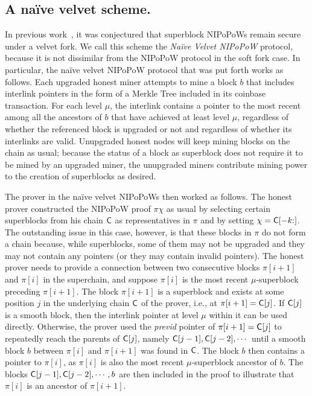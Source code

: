 \subsection{A na\"ive velvet scheme.}
In previous work~\cite{nipopows}, it was conjectured that superblock NIPoPoWs
remain secure under a velvet fork. We call this scheme the \emph{Na\"ive Velvet
NIPoPoW} protocol, because it is not dissimilar from the NIPoPoW protocol in the
soft fork case. In particular, the na\"ive velvet NIPoPoW protocol that was put
forth works as follows. Each upgraded honest miner attempts to mine a block $b$
that includes interlink pointers in the form of a Merkle Tree included in its
coinbase transaction. For each level $\mu$, the interlink contains a pointer to
the most recent among all the ancestors of $b$ that have achieved at least
level $\mu$, regardless of whether the referenced block is upgraded or not and
regardless of whether its interlinks are valid. Unupgraded honest nodes will
keep mining blocks on the chain as usual; because the status of a block as
superblock does not require it to be mined by an upgraded miner, the unupgraded
miners contribute mining power to the creation of superblocks as desired.

The prover in the na\"ive velvet NIPoPoWs then worked as follows. The honest
prover constructed the NIPoPoW proof $\pi \chi$ as usual by selecting certain
superblocks from his chain $\mathsf{C}$ as representatives in $\pi$ and by setting
$\chi = \mathsf{C}[-k{:}]$. The outstanding issue in this case, however, is that
these blocks in $\pi$ do not form a chain because, while superblocks, some of
them may not be upgraded and they may not contain any pointers (or they may
contain invalid pointers). The honest prover needs to provide a connection
between two consecutive blocks $\pi[i + 1]$ and $\pi[i]$ in the superchain, and
suppose $\pi[i]$ is the most recent $\mu$-superblock preceding $\pi[i + 1]$. The
block $\pi[i + 1]$ is a superblock and exists at some position $j$ in the
underlying chain $\mathsf{C}$ of the prover, i.e., at $\pi[i + 1] = \mathsf{C}[j]$. If
$\mathsf{C}[j]$ is a smooth block, then the interlink pointer at level $\mu$ within
it can be used directly. Otherwise, the prover used the \emph{previd} pointer of
$\pi[i + 1] = \mathsf{C}[j]$ to repeatedly reach the parents of $\mathsf{C}[j]$, namely
$\mathsf{C}[j - 1], \mathsf{C}[j - 2], \cdots$ until a smooth block $b$ between $\pi[i]$
and $\pi[i + 1]$ was found in $\mathsf{C}$. The block $b$ then contains a pointer to
$\pi[i]$, as $\pi[i]$ is also the most recent $\mu$-superblock ancestor of $b$.
The blocks $\mathsf{C}[j - 1], \mathsf{C}[j - 2], \cdots, b$ are then included in the
proof to illustrate that $\pi[i]$ is an ancestor of $\pi[i + 1]$.

